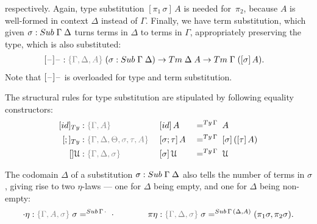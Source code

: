 \documentclass[a4paper,UKenglish,numberwithinsect,cleveref,thm-restate]{lipics-v2021}
\begin{document}
respectively.
Again, type substitution $[\pi_1\,\sigma]\,A$ is needed for~$\pi_2$, because $A$ is well-formed in context $\Delta$ instead of $\Gamma$.
Finally, we have term substitution, which given $\sigma : \Sub\;\Gamma\;\Delta$ turns terms in $\Delta$ to terms in $\Gamma$, appropriately preserving the type, which is also substituted:
\begin{alignat*}{3}
  [\blank] \blank & : \implicit{\Gamma,\Delta, A}\;(\sigma : \Sub\;\Gamma\;\Delta) \to \Tm\;\Delta\;A \to \Tm\;\Gamma\;([\sigma]\, A).
\end{alignat*}
Note that $[\mathord{\hspace{1pt}\text{--}\hspace{1pt}}]\mathord{\hspace{1pt}\text{--}\hspace{1pt}}$ is overloaded for type and term substitution.

The structural rules for type substitution are stipulated by following equality constructors:
\begin{alignat*}{3}
  [\idS]_{\Ty} & : \implicit{\Gamma, A}                               && [ \idS ] \,A           && =^{\Ty\,\Gamma}\;A \\
  [;]_{\Ty}    & : \implicit{\Gamma, \Delta, \Theta, \sigma, \tau, A}\;&& [ \sigma ; \tau ]\,A  && =^{\Ty\,\Gamma}\;[ \sigma ]\,([ \tau ]\,A) \\
  []\UU      & : \implicit{\Gamma, \Delta, \sigma}                    && [ \sigma ]\,\UU        && =^{\Ty\,\Gamma}\;\UU
\end{alignat*}

The codomain $\Delta$ of a substitution $\sigma:\Sub\;\Gamma\;\Delta$ also tells the number of terms in $\sigma$, giving rise to two $\eta$-laws --- one for $\Delta$ being empty, and one for $\Delta$ being non-empty:
\[
  \emptyctx\eta : \implicit{\Gamma, A, \sigma}\; \sigma        =^{\Sub\,\Gamma\,\emptyctx} \; \emptysub
  \qquad\qquad
  \pi\eta       : \implicit{\Gamma, \Delta, \sigma}\; \sigma   =^{\Sub\,\Gamma\,(\Delta, A)} (\pi_1 \sigma, \pi_2 \sigma).
\]
\end{document}
